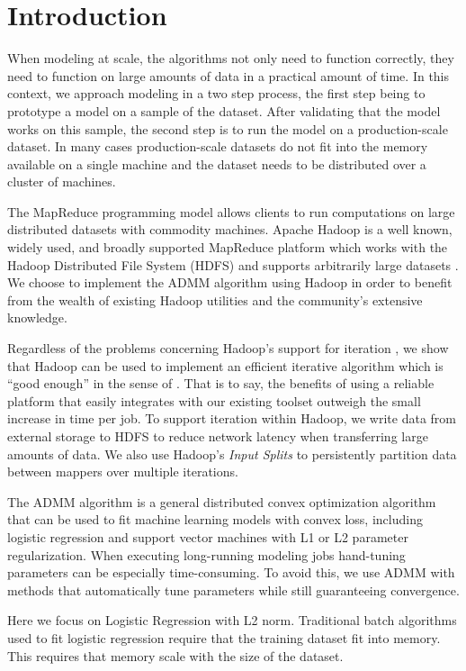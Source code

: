 \documentclass[10pt, conference, compsocconf]{IEEEtran}
\begin{document}
\section{Introduction}
When modeling at scale, the algorithms not only need to function correctly, they need to function on large amounts of data in a practical amount of time.  In this context, we approach modeling in a two step process, the first step being to prototype a model on a sample of the dataset. After validating that the model works on this sample, the second step is to run the model on a production-scale dataset.  In many cases production-scale datasets do not fit into the memory available on a single machine and the dataset needs to be distributed over a cluster of machines.

The MapReduce programming model \cite{dean2004} allows clients to run computations on large distributed datasets with commodity machines.  Apache Hadoop is a well known, widely used, and broadly supported MapReduce platform which works with the Hadoop Distributed File System (HDFS)  and supports arbitrarily large datasets \cite{white2009}.  We choose to implement the ADMM algorithm using Hadoop in order to benefit from the wealth of existing Hadoop utilities and the community's extensive knowledge.

Regardless of the problems concerning Hadoop's support for iteration \cite{bu2010}, we show that Hadoop can be used to implement an efficient iterative algorithm which is ``good enough'' in the sense of \cite{lin2012}.  That is to say, the benefits of using a reliable platform that easily integrates with our existing toolset outweigh the small increase in time per job.  To support iteration within Hadoop, we write data from external storage to HDFS to reduce network latency when transferring large amounts of data.  We also use Hadoop's \emph{Input Splits} to persistently partition data between mappers over multiple iterations. 

The ADMM algorithm is a general distributed convex optimization algorithm that can be used to fit machine learning models with convex loss, including logistic regression and support vector machines with L1 or L2 parameter regularization.  When executing long-running modeling jobs hand-tuning parameters can be especially time-consuming.  To avoid this, we use ADMM with methods that automatically tune parameters while still guaranteeing convergence.

Here we focus on Logistic Regression with L2 norm. Traditional batch algorithms used to fit logistic regression require that the training dataset fit into memory.  This requires that memory scale with the size of the dataset.
\end{document}
